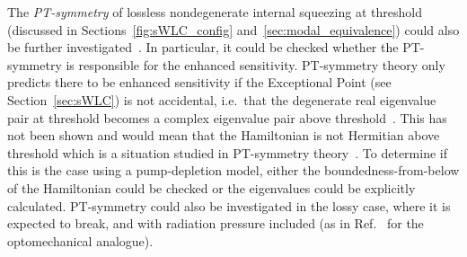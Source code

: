 The \emph{PT-symmetry} of lossless nondegenerate internal squeezing at threshold (discussed in Sections~\ref{fig:sWLC_config} and~\ref{sec:modal_equivalence}) could also be further investigated~\cite{CMBPersonalCommunication}. In particular, it could be checked whether the PT-symmetry is responsible for the enhanced sensitivity.
PT-symmetry theory only predicts there to be enhanced sensitivity if the Exceptional Point (see Section~\ref{sec:sWLC}) is not accidental, i.e.\ that the degenerate real eigenvalue pair at threshold becomes a complex eigenvalue pair above threshold~\cite{liu2016metrology,hodaei2017enhanced}. This has not been shown and would mean that the Hamiltonian is not Hermitian above threshold which is a situation studied in PT-symmetry theory~\cite{el2018non}. To determine if this is the case using a pump-depletion model, either the boundedness-from-below of the Hamiltonian could be checked or the eigenvalues could be explicitly calculated.
PT-symmetry could also be investigated in the lossy case, where it is expected to break, and with radiation pressure included (as in Ref.~\cite{liBroadbandSensitivityImprovement2020} for the optomechanical analogue). %


